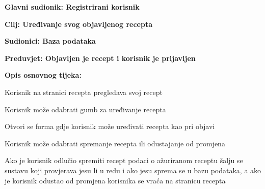				
				\noindent {}
				\begin{packed_item}
					
					\item \textbf{Glavni sudionik: Registrirani korisnik}
					\item  \textbf{Cilj: Uređivanje svog objavljenog recepta} 
					\item  \textbf{Sudionici: Baza podataka} 
					\item  \textbf{Preduvjet: Objavljen je recept i korisnik je prijavljen} 
					\item  \textbf{Opis osnovnog tijeka:}
					
					\item[] \begin{packed_enum}
						
						\item Korisnik na stranici recepta pregledava svoj recept
						\item Korisnik može odabrati gumb za uređivanje recepta
						\item Otvori se forma gdje korisnik može uređivati recepta kao pri objavi
						\item Korisnik može odabrati spremanje recepta ili odustajanje od promjena
						\item Ako je korisnik odlučio spremiti recept podaci o ažuriranom receptu šalju se sustavu koji provjerava jesu li u redu i ako jesu sprema se u bazu podataka, a ako je korisnik odustao od promjena korisnika se vraća na stranicu recepta
					\end{packed_enum}
					
					
				\end{packed_item}
				
